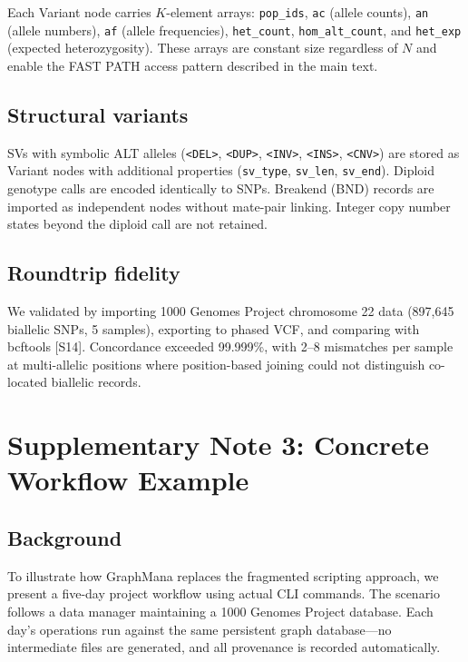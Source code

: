\documentclass[11pt,a4paper]{article}
\begin{document}
Each Variant node carries $K$-element arrays: \texttt{pop\_ids}, \texttt{ac} (allele counts), \texttt{an} (allele numbers), \texttt{af} (allele frequencies), \texttt{het\_count}, \texttt{hom\_alt\_count}, and \texttt{het\_exp} (expected heterozygosity). These arrays are constant size regardless of $N$ and enable the FAST PATH access pattern described in the main text.

\subsection*{Structural variants}

SVs with symbolic ALT alleles (\texttt{<DEL>}, \texttt{<DUP>}, \texttt{<INV>}, \texttt{<INS>}, \texttt{<CNV>}) are stored as Variant nodes with additional properties (\texttt{sv\_type}, \texttt{sv\_len}, \texttt{sv\_end}). Diploid genotype calls are encoded identically to SNPs. Breakend (BND) records are imported as independent nodes without mate-pair linking. Integer copy number states beyond the diploid call are not retained.

\subsection*{Roundtrip fidelity}

We validated by importing 1000 Genomes Project chromosome 22 data (897,645 biallelic SNPs, 5 samples), exporting to phased VCF, and comparing with bcftools [S14]. Concordance exceeded 99.999\%, with 2--8 mismatches per sample at multi-allelic positions where position-based joining could not distinguish co-located biallelic records.

\newpage

\section{Supplementary Note 3: Concrete Workflow Example}

\subsection*{Background}

To illustrate how GraphMana replaces the fragmented scripting approach, we present a five-day project workflow using actual CLI commands. The scenario follows a data manager maintaining a 1000 Genomes Project database. Each day's operations run against the same persistent graph database---no intermediate files are generated, and all provenance is recorded automatically.
\end{document}
